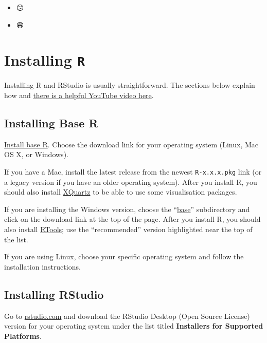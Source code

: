\documentclass[
  oneside]{book}
\begin{document}
\begin{itemize}
\item
  😕
\item
  😄
\end{itemize}

\hypertarget{appendix-appendices}{%
\appendix}


\hypertarget{installing-r}{%
\chapter{\texorpdfstring{Installing \texttt{R}}{Installing R}}\label{installing-r}}

Installing R and RStudio is usually straightforward. The sections below explain how and \href{https://www.youtube.com/watch?v=lVKMsaWju8w}{there is a helpful YouTube video here}.

\hypertarget{installing-base-r}{%
\section{Installing Base R}\label{installing-base-r}}

\href{https://cran.rstudio.com/}{Install base R}. Choose the download link for your operating system (Linux, Mac OS X, or Windows).

If you have a Mac, install the latest release from the newest \texttt{R-x.x.x.pkg} link (or a legacy version if you have an older operating system). After you install R, you should also install \href{http://xquartz.macosforge.org/}{XQuartz} to be able to use some visualisation packages.

If you are installing the Windows version, choose the ``\href{https://cran.rstudio.com/bin/windows/base/}{base}'' subdirectory and click on the download link at the top of the page. After you install R, you should also install \href{https://cran.rstudio.com/bin/windows/Rtools/}{RTools}; use the ``recommended'' version highlighted near the top of the list.

If you are using Linux, choose your specific operating system and follow the installation instructions.

\hypertarget{installing-rstudio}{%
\section{Installing RStudio}\label{installing-rstudio}}

Go to \href{https://www.rstudio.com/products/rstudio/download/\#download}{rstudio.com} and download the RStudio Desktop (Open Source License) version for your operating system under the list titled \textbf{Installers for Supported Platforms}.
\end{document}
